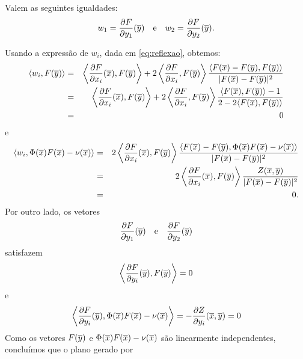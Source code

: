 \begin{lema}
	Valem as seguintes igualdades:
	\begin{equation*}
	w_1 = \frac{\partial F}{\partial y_1}(\overline{y}) 
	\quad \text{e} \quad 
	w_2 = \frac{\partial F}{\partial y_2}(\overline{y}).
	\end{equation*}
\end{lema}
\begin{demonstracao}
	Usando a express\~ao de $w_i$, dada em \eqref{eq:reflexao}, obtemos:
	\begin{eqnarray*}
		\langle w_i, F(\overline{y}) \rangle &=& \left\langle \frac{\partial F}{\partial x_i}(\overline{x}), F(\overline{y}) \right\rangle + 2 \left\langle \frac{\partial F}{\partial x_i}, F(\overline{y}) \right\rangle \frac{\langle F(\overline{x}) - F(\overline{y}),F(\overline{y}) \rangle}{| F(\overline{x}) - F(\overline{y}) |^2} \\
		&=& \left\langle \frac{\partial F}{\partial x_i}(\overline{x}), F(\overline{y}) \right\rangle 
		+ 2 \left\langle \frac{\partial F}{\partial x_i}, F(\overline{y}) \right\rangle \frac{\langle F(\overline{x}),F(\overline{y}) \rangle - 1}{2 - 2 \langle F(\overline{x}), F(\overline{y}) \rangle} \\
		&=& 0
	\end{eqnarray*}
	e
	\begin{eqnarray*}
		\langle w_i, \Phi(\overline{x}) F(\overline{x}) - \nu(\overline{x}) \rangle &=&
		2 \left\langle \frac{\partial F}{\partial x_i}(\overline{x}), F(\overline{y}) \right\rangle \frac{\langle F(\overline{x}) - F(\overline{y}), \Phi(\overline{x}) F(\overline{x}) - \nu(\overline{x}) \rangle}{| F(\overline{x}) - F(\overline{y}) |^2} \\
		& = & 2 \left\langle \frac{\partial F}{\partial x_i}(\overline{x}), F(\overline{y}) \right\rangle \frac{Z(\overline{x},\overline{y})}{| F(\overline{x}) - F(\overline{y}) |^2} \\
		& = & 0.
	\end{eqnarray*}
	Por outro lado, os vetores
	\begin{equation*}
	\frac{\partial F}{\partial y_1}(\overline{y}) \quad \text{e} \quad \frac{\partial F}
	{\partial y_2}(\overline{y})
	\end{equation*}
	satisfazem
	\begin{equation*}
	\left\langle \frac{\partial F}{\partial y_i}(\overline{y}), F(\overline{y})\right\rangle = 0
	\end{equation*}
	e
	\begin{equation*}
	\left\langle \frac{\partial F}{\partial y_i}(\overline{y}), \Phi(\overline{x}) F(\overline{x}) - 
	\nu(\overline{x}) \right\rangle = -\frac{\partial Z}{\partial y_i}(\overline{x},\overline{y}) 
	= 0
	\end{equation*}
	Como os vetores $F(\overline{y})$ e $ \Phi(\overline{x}) F(\overline{x}) - \nu(\overline{x})$
	são linearmente independentes, conclu\'imos que o plano gerado por
	\begin{equation*}

\end{equation*}
\end{demonstracao}
